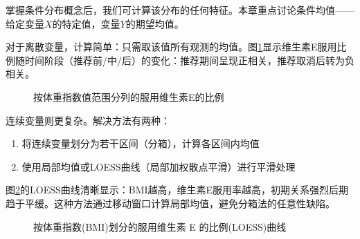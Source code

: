 掌握条件分布概念后，我们可计算该分布的任何特征。本章重点讨论条件均值——给定变量$X$的特定值，变量$Y$的期望均值。

对于离散变量，计算简单：只需取该值所有观测的均值。图\ref{fig:VitaminE_by_BMI}显示维生素E服用比例随时间阶段（推荐前/中/后）的变化：推荐期间呈现正相关，推荐取消后转为负相关。

\begin{figure}[ht]
	\centering
	\caption{按体重指数值范围分列的服用维生素E的比例}
	\label{fig:VitaminE_by_BMI}
\end{figure}

连续变量则更复杂。解决方法有两种：
\begin{enumerate}
	\item 将连续变量划分为若干区间（分箱），计算各区间内均值
	\item 使用局部均值或LOESS曲线（局部加权散点平滑）进行平滑处理
\end{enumerate}

图\ref{fig:LOESS_Curve}的LOESS曲线清晰显示：BMI越高，维生素E服用率越高，初期关系强烈后期趋于平缓。这种方法通过移动窗口计算局部均值，避免分箱法的任意性缺陷。

\begin{figure}[ht]
	\centering
	\caption{按体重指数(BMI)划分的服用维生素 E 的比例(LOESS)曲线}
	\label{fig:LOESS_Curve}
\end{figure}

